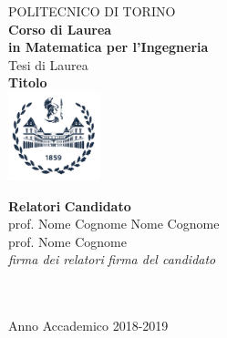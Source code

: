 \begin{titlepage}

\begin{center}

{\huge POLITECNICO DI TORINO}\\[1.5cm]
\textbf{Corso di Laurea\\in Matematica per l'Ingegneria}\\[3cm]

{\Large Tesi di Laurea}\\[1cm]
\textbf{\LARGE Titolo }\\[2cm]
\includegraphics[width=0.2\textwidth]{./Pictures/logo_polito_2021.jpg}
\vspace{4cm}


\begin{minipage}{0.85\textwidth}
\begin{flushleft}\large
\textbf{Relatori} \hfill \textbf{Candidato}\\
prof. Nome Cognome \hfill Nome Cognome\\
prof. Nome Cognome \\
\textit{firma dei relatori} \hfill \textit{firma del candidato}\\[0.35cm]
\fillin\ \hfill \\
\fillin\ \hfill \fillin
\end{flushleft}
\end{minipage}

\vfill

Anno Accademico 2018-2019
\end{center}

\restoregeometry %

\end{titlepage}